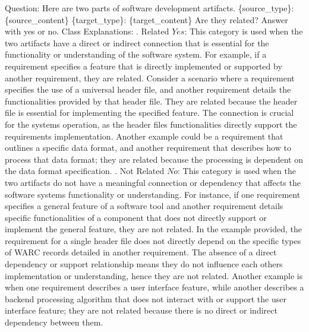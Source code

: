 Question: Here are two parts of software development artifacts.\newline
\newline
\{source\_type\}: \textquotesingle{}\textquotesingle{}\textquotesingle{}\{source\_content\}\textquotesingle{}\textquotesingle{}\textquotesingle{}\newline
\newline
\{target\_type\}: \textquotesingle{}\textquotesingle{}\textquotesingle{}\{target\_content\}\textquotesingle{}\textquotesingle{}\textquotesingle{}\newline
Are they related?\newline
\newline
Answer with \textquotesingle{}yes\textquotesingle{} or \textquotesingle{}no\textquotesingle{}.\newline
\newline
Class Explanations:\newline
{}. Related \(Yes\): This category is used when the two artifacts have a direct or indirect connection that is essential for the functionality or understanding of the software system. For example, if a requirement specifies a feature that is directly implemented or supported by another requirement, they are related. Consider a scenario where a requirement specifies the use of a universal header file, and another requirement details the functionalities provided by that header file. They are related because the header file is essential for implementing the specified feature. The connection is crucial for the system\textquotesingle{}s operation, as the header file\textquotesingle{}s functionalities directly support the requirement\textquotesingle{}s implementation. Another example could be a requirement that outlines a specific data format, and another requirement that describes how to process that data format; they are related because the processing is dependent on the data format specification.\newline
{}. Not Related \(No\): This category is used when the two artifacts do not have a meaningful connection or dependency that affects the software system\textquotesingle{}s functionality or understanding. For instance, if one requirement specifies a general feature of a software tool and another requirement details specific functionalities of a component that does not directly support or implement the general feature, they are not related. In the example provided, the requirement for a single header file does not directly depend on the specific types of WARC records detailed in another requirement. The absence of a direct dependency or support relationship means they do not influence each other\textquotesingle{}s implementation or understanding, hence they are not related. Another example is when one requirement describes a user interface feature, while another describes a backend processing algorithm that does not interact with or support the user interface feature; they are not related because there is no direct or indirect dependency between them.